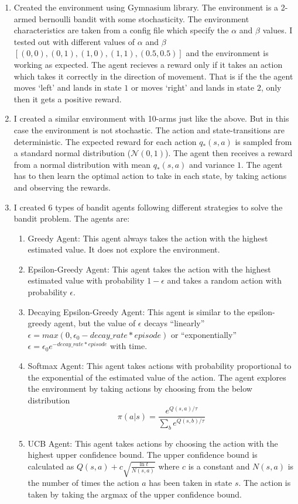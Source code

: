 \begin{enumerate}
    \item Created the environment using Gymnasium library. The environment is a 2-armed bernoulli bandit with some stochasticity. The environment characteristics are taken from a config file which specify the $\alpha$ and $\beta$ values. I tested out with different values of $\alpha$ and $\beta$ $[(0,0), (0,1), (1,0), (1,1), (0.5,0.5)]$ and the environment is working as expected. The agent recieves a reward only if it takes an action which takes it correctly in the direction of movement. That is if the the agent moves `left' and lands in state $1$ or moves `right' and lands in state $2$, only then it gets a positive reward. 
    
    \item I created a similar environment with 10-arms just like the above. But in this case the environment is not stochastic. The action and state-transitions are deterministic. The expected reward for each action $q_*(s, a)$ is sampled from a standard normal distribution ($\mathcal{N}(0, 1)$). The agent then receives a reward from a normal distribution with mean $q_*(s, a)$ and variance $1$. The agent has to then learn the optimal action to take in each state, by taking actions and observing the rewards.
    
    \item I created 6 types of bandit agents following different strategies to solve the bandit problem. The agents are:
    \begin{enumerate}
        \item Greedy Agent: This agent always takes the action with the highest estimated value. It does not explore the environment.
        \item Epsilon-Greedy Agent: This agent takes the action with the highest estimated value with probability $1-\epsilon$ and takes a random action with probability $\epsilon$.
        \item Decaying Epsilon-Greedy Agent: This agent is similar to the epsilon-greedy agent, but the value of $\epsilon$ decays ``linearly'' $\epsilon=max(0, \epsilon_0 - decay\_rate * episode)$ or ``exponentially'' $\epsilon=\epsilon_0e^{-decay\_rate*episode}$ with time. 
        \item Softmax Agent: This agent takes actions with probability proportional to the exponential of the estimated value of the action. The agent explores the environment by taking actions by choosing from the below distribution
        \begin{equation}
            \pi(a|s) = \frac{e^{Q(s,a)/\tau}}{\sum_{b}e^{Q(s,b)/\tau}}
        \end{equation}
        \item UCB Agent: This agent takes actions by choosing the action with the highest upper confidence bound. The upper confidence bound is calculated as $Q(s,a) + c\sqrt{\frac{\ln t}{N(s,a)}}$ where $c$ is a constant and $N(s,a)$ is the number of times the action $a$ has been taken in state $s$. The action is taken by taking the argmax of the upper confidence bound. 
    \end{enumerate}
    

\end{enumerate}
